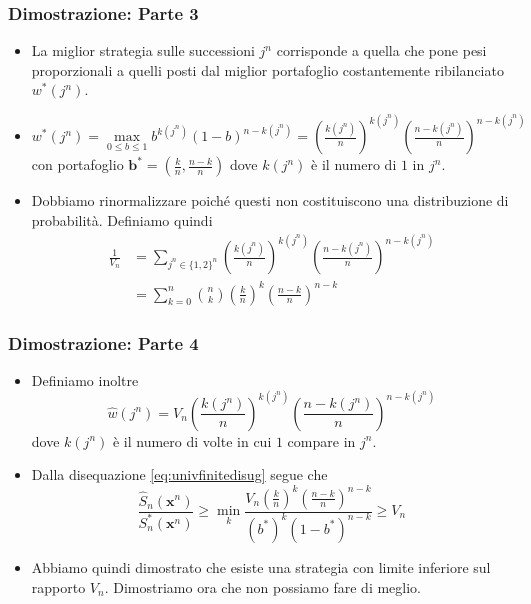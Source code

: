 \documentclass{beamer}
\theoremstyle{plain}
\theoremstyle{definition}
\theoremstyle{remark}
\newcommand{\x}{\bm{x}}
\newcommand{\B}{\bm{b}}
\newcommand{\Sh}{\hat{S}}
\begin{document}
\begin{frame}
	\frametitle{Dimostrazione: Parte 3}
	\begin{itemize}
		\item La miglior strategia sulle successioni $j^n$ corrisponde a quella che pone pesi proporzionali a quelli posti dal miglior portafoglio costantemente ribilanciato $w^*(j^n)$.
		\item $w^*(j^n) =\max\limits_{0\leq b\leq 1}b^{k(j^n)}(1-b)^{n-k(j^n)}=\left(\frac{k(j^n)}{n}\right)^{k(j^n)}\left(\frac{n-k(j^n)}{n}\right)^{n-k(j^n)}$
		con portafoglio $\B^*=\left(\frac{k}{n},\frac{n-k}{n}\right)$ dove $k(j^n)$ è il numero di $1$ in $j^n$.
		\item Dobbiamo rinormalizzare poiché questi non costituiscono una distribuzione di probabilità. Definiamo quindi
		\begin{equation*}
		\begin{split}
		\frac{1}{V_n}&=\sum_{j^n\in\{1,2\}^n}{\left(\frac{k(j^n)}{n}\right)^{k(j^n)}\left(\frac{n-k(j^n)}{n}\right)^{n-k(j^n)}}\\
		& = \sum_{k = 0}^n{\binom{n}{k}\left(\frac{k}{n}\right)^k\left(\frac{n-k}{n}\right)^{n-k}}
		\end{split}
		\end{equation*}
	\end{itemize}
\end{frame}

\begin{frame}
	\frametitle{Dimostrazione: Parte 4}
	\begin{itemize}
		\item Definiamo inoltre
		\begin{equation}\label{eq:strategy-weight}
		\hat{w}(j^n)=V_n\left(\frac{k(j^n)}{n}\right)^{k(j^n)}\left(\frac{n-k(j^n)}{n}\right)^{n-k(j^n)}
		\end{equation}
		dove $k(j^n)$ è il numero di volte in cui $1$ compare in $j^n$.
		\item Dalla disequazione \ref{eq:univfinitedisug} segue che
		\begin{equation*}
			\frac{\Sh_n(\x^n)}{S_n^*(\x^n)} \geq  \min\limits_k\frac{V_n\left(\frac{k}{n}\right)^k\left(\frac{n-k}{n}\right)^{n-k}}{(b^*)^k(1-b^*)^{n-k}} \geq V_n
	\end{equation*}
	\item Abbiamo quindi dimostrato che esiste una strategia con limite inferiore sul rapporto $V_n$. Dimostriamo ora che non possiamo fare di meglio.
	\end{itemize}
\end{frame}
\end{document}
